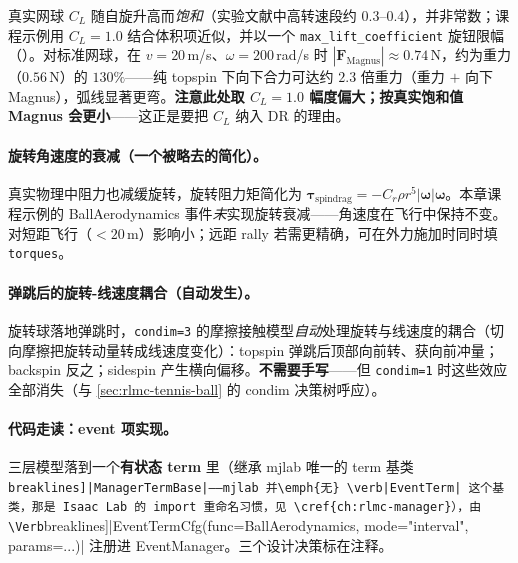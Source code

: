 真实网球 $C_L$ 随自旋升高而\emph{饱和}（实验文献中高转速段约 $0.3$--$0.4$），并非常数；课程示例用 $C_L=1.0$ 结合体积项近似，并以一个 \texttt{max\_lift\_coefficient} 旋钮限幅（）。对标准网球，在 $v=20$\,m/s、$\omega=200$\,rad/s 时 $|\mathbf F_{\text{Magnus}}|\approx0.74$\,N，约为重力（$0.56$\,N）的 $130\%$——纯 topspin 下向下合力可达约 $2.3$ 倍重力（重力 $+$ 向下 Magnus），弧线显著更弯。\textbf{注意此处取 $C_L=1.0$ 幅度偏大；按真实饱和值 Magnus 会更小}——这正是要把 $C_L$ 纳入 DR 的理由。

\paragraph{旋转角速度的衰减（一个被略去的简化）。}真实物理中阻力也减缓旋转，旋转阻力矩简化为 $\boldsymbol\tau_{\text{spindrag}}=-C_r\rho r^5|\boldsymbol\omega|\boldsymbol\omega$。本章课程示例的 BallAerodynamics 事件\emph{未}实现旋转衰减——角速度在飞行中保持不变。对短距飞行（$<20$\,m）影响小；远距 rally 若需更精确，可在外力施加时同时填 \verb|torques|。

\paragraph{弹跳后的旋转-线速度耦合（自动发生）。}旋转球落地弹跳时，\verb|condim=3| 的摩擦接触模型\emph{自动}处理旋转与线速度的耦合（切向摩擦把旋转动量转成线速度变化）：topspin 弹跳后顶部向前转、获向前冲量；backspin 反之；sidespin 产生横向偏移。\textbf{不需要手写}——但 \verb|condim=1| 时这些效应全部消失（与 \cref{sec:rlmc-tennis-ball} 的 condim 决策树呼应）。

\paragraph{代码走读：event 项实现。}三层模型落到一个\textbf{有状态 term} 里（继承 mjlab 唯一的 term 基类 \Verb[breaklines]|ManagerTermBase|——mjlab 并\emph{无} \verb|EventTerm| 这个基类，那是 Isaac Lab 的 import 重命名习惯，见 \cref{ch:rlmc-manager}），由 \Verb[breaklines]|EventTermCfg(func=BallAerodynamics, mode="interval", params=...)| 注册进 EventManager。三个设计决策标在注释。

